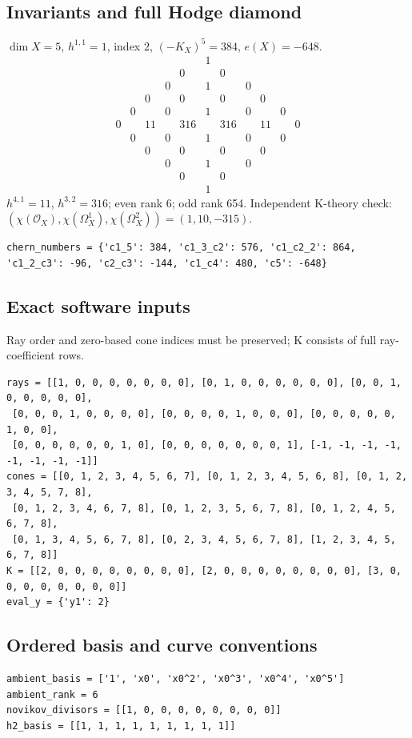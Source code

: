 \documentclass[10pt,a4paper]{article}
\begin{document}
\subsection*{Invariants and full Hodge diamond}
$\dim X=5$, $h^{1,1}=1$, index $2$, $(-K_X)^5=384$, $e(X)=-648$.
\[\begin{array}{ccccccccccc}&&&&&1&&&&&\\&&&&0&&0&&&&\\&&&0&&1&&0&&&\\&&0&&0&&0&&0&&\\&0&&0&&1&&0&&0&\\0&&11&&316&&316&&11&&0\\&0&&0&&1&&0&&0&\\&&0&&0&&0&&0&&\\&&&0&&1&&0&&&\\&&&&0&&0&&&&\\&&&&&1&&&&&\end{array}\]
$h^{4,1}=11$, $h^{3,2}=316$; even rank 6; odd rank 654.
Independent K-theory check: $(\chi(\mathcal O_X),\chi(\Omega_X^1),\chi(\Omega_X^2))=(1, 10, -315)$.
\begin{lstlisting}
chern_numbers = {'c1_5': 384, 'c1_3_c2': 576, 'c1_c2_2': 864, 'c1_2_c3': -96, 'c2_c3': -144, 'c1_c4': 480, 'c5': -648}
\end{lstlisting}
\subsection*{Exact software inputs}
Ray order and zero-based cone indices must be preserved; K consists of full ray-coefficient rows.
\begin{lstlisting}
rays = [[1, 0, 0, 0, 0, 0, 0, 0], [0, 1, 0, 0, 0, 0, 0, 0], [0, 0, 1, 0, 0, 0, 0, 0],
 [0, 0, 0, 1, 0, 0, 0, 0], [0, 0, 0, 0, 1, 0, 0, 0], [0, 0, 0, 0, 0, 1, 0, 0],
 [0, 0, 0, 0, 0, 0, 1, 0], [0, 0, 0, 0, 0, 0, 0, 1], [-1, -1, -1, -1, -1, -1, -1, -1]]
cones = [[0, 1, 2, 3, 4, 5, 6, 7], [0, 1, 2, 3, 4, 5, 6, 8], [0, 1, 2, 3, 4, 5, 7, 8],
 [0, 1, 2, 3, 4, 6, 7, 8], [0, 1, 2, 3, 5, 6, 7, 8], [0, 1, 2, 4, 5, 6, 7, 8],
 [0, 1, 3, 4, 5, 6, 7, 8], [0, 2, 3, 4, 5, 6, 7, 8], [1, 2, 3, 4, 5, 6, 7, 8]]
K = [[2, 0, 0, 0, 0, 0, 0, 0, 0], [2, 0, 0, 0, 0, 0, 0, 0, 0], [3, 0, 0, 0, 0, 0, 0, 0, 0]]
eval_y = {'y1': 2}
\end{lstlisting}
\subsection*{Ordered basis and curve conventions}
\begin{lstlisting}
ambient_basis = ['1', 'x0', 'x0^2', 'x0^3', 'x0^4', 'x0^5']
ambient_rank = 6
novikov_divisors = [[1, 0, 0, 0, 0, 0, 0, 0, 0]]
h2_basis = [[1, 1, 1, 1, 1, 1, 1, 1, 1]]
\end{lstlisting}
\end{document}
